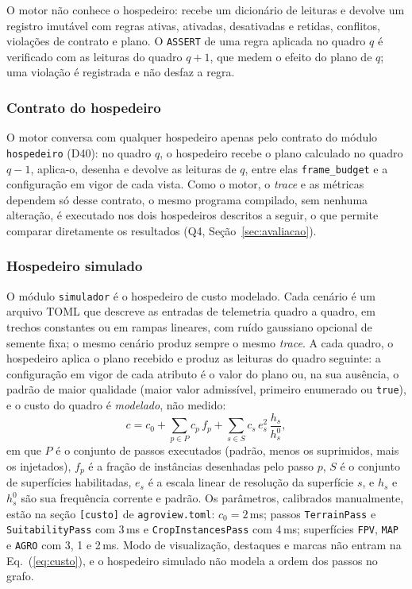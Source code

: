 \documentclass[conference]{IEEEtran}
\begin{document}
O motor não conhece o hospedeiro: recebe um dicionário de leituras e devolve um
registro imutável com regras ativas, ativadas, desativadas e retidas,
conflitos, violações de contrato e plano. O \texttt{ASSERT} de uma regra
aplicada no quadro $q$ é verificado com as leituras do quadro $q+1$, que medem
o efeito do plano de $q$; uma violação é registrada e não desfaz a regra.

\subsubsection{Contrato do hospedeiro}
\label{sec:contrato}
O motor conversa com qualquer hospedeiro apenas pelo contrato do módulo
\texttt{hospedeiro} (D40): no quadro $q$, o hospedeiro recebe o plano calculado
no quadro $q-1$, aplica-o, desenha e devolve as leituras de $q$, entre elas
\texttt{frame\_budget} e a configuração em vigor de cada vista. Como o motor,
o \textit{trace} e as métricas dependem só desse contrato, o mesmo programa
compilado, sem nenhuma alteração, é executado nos dois hospedeiros descritos a
seguir, o que permite comparar diretamente os resultados (Q4,
Seção~\ref{sec:avaliacao}).

\subsubsection{Hospedeiro simulado}
\label{sec:hospedeiro}
O módulo \texttt{simulador} é o hospedeiro de custo modelado. Cada cenário é um
arquivo TOML que descreve as entradas de telemetria quadro a quadro, em trechos
constantes ou em rampas lineares, com ruído gaussiano opcional de semente fixa;
o mesmo cenário produz sempre o mesmo \textit{trace}. A cada quadro, o
hospedeiro aplica o plano recebido e produz as leituras do quadro seguinte: a
configuração em vigor de cada atributo é o valor do plano ou, na sua ausência,
o padrão de maior qualidade (maior valor admissível, primeiro enumerado ou
\texttt{true}), e o custo do quadro é \emph{modelado}, não medido:
\begin{equation}
c = c_0 + \sum_{p \in P} c_p\, f_p
        + \sum_{s \in S} c_s\, e_s^{2}\, \frac{h_s}{h_s^{0}},
\label{eq:custo}
\end{equation}
em que $P$ é o conjunto de passos executados (padrão, menos os suprimidos, mais
os injetados), $f_p$ é a fração de instâncias desenhadas pelo passo $p$, $S$ é
o conjunto de superfícies habilitadas, $e_s$ é a escala linear de resolução da
superfície $s$, e $h_s$ e $h_s^{0}$ são sua frequência corrente e padrão. Os
parâmetros, calibrados manualmente, estão na seção \texttt{[custo]} de
\texttt{agroview.toml}: $c_0 = 2$\,ms; passos \texttt{TerrainPass} e
\texttt{SuitabilityPass} com 3\,ms e \texttt{CropInstancesPass} com 4\,ms;
superfícies \texttt{FPV}, \texttt{MAP} e \texttt{AGRO} com 3, 1 e 2\,ms. Modo de
visualização, destaques e marcas não entram na Eq.~(\ref{eq:custo}), e o
hospedeiro simulado não modela a ordem dos passos no grafo.
\end{document}

